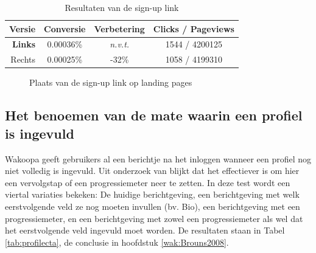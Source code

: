 \documentclass[a4paper, 10pt, pdftex]{report}
\begin{document}
      \begin{table}[ht]
      \centering
      \begin{tabular}{r|*{3}{c}}
        \textbf{Versie}  & Conversie  & Verbetering & Clicks / Pageviews \\ \hline
        \textbf{Links}   & 0.00036\%  & \emph{n.v.t.}        & 1544 / 4200125 \\
        Rechts  & 0.00025\%  & -32\%                & 1058 / 4199310 \\
      \end{tabular}
      \caption{Resultaten van de sign-up link}
      \label{tab:signupcta}
      \end{table}

      \begin{figure}
        \caption{Plaats van de sign-up link op landing pages}
      \end{figure}

    \subsection{Het benoemen van de mate waarin een profiel is ingevuld}
      \label{profileprogress}
      Wakoopa geeft gebruikers al een berichtje na het inloggen wanneer een profiel nog niet volledig is ingevuld. Uit onderzoek van \cite{Brouns2008} blijkt dat het effectiever is om hier een vervolgstap of een progressiemeter neer te zetten. In deze test wordt een viertal variaties bekeken: De huidige berichtgeving, een berichtgeving met welk eerstvolgende veld ze nog moeten invullen (bv. Bio), een berichtgeving met een progressiemeter, en een berichtgeving met zowel een progressiemeter als wel dat het eerstvolgende veld ingevuld moet worden.  De resultaten staan in Tabel \ref{tab:profilecta}, de conclusie in hoofdstuk \ref{wak:Brouns2008}.
\end{document}
